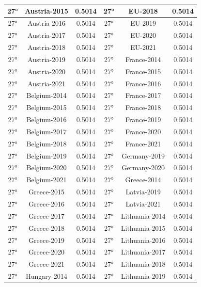 \documentclass[a4paper,12pt, openright]{report}
\begin{document}
\begin{longtable}[c]{|c|c|c|c|c|c|}
    \hline
    27° & Austria-2015 & 0.5014 & 27° & EU-2018 & 0.5014 \\
    \hline
    27° &  Austria-2016 & 0.5014 & 27°	& EU-2019 & 0.5014 \\
    \hline
    27° &  Austria-2017 & 0.5014 & 27° &  EU-2020 & 0.5014\\
    \hline
    27° & Austria-2018 & 0.5014 & 27° &  EU-2021  & 0.5014 \\
    \hline
    27° &  Austria-2019  & 0.5014& 27° &  France-2014 & 0.5014 \\
    \hline
    27° &  Austria-2020 & 0.5014 & 27° & France-2015 & 0.5014 \\
    \hline
    27° & Austria-2021 & 0.5014 & 27° &  France-2016 & 0.5014 \\
    \hline
    27° &  Belgium-2014 & 0.5014 & 27° & France-2017 & 0.5014 \\
    \hline
    27° &  Belgium-2015 & 0.5014 & 27° & France-2018  & 0.5014 \\
    \hline
    27° & Belgium-2016  & 0.5014 & 27° &  France-2019 & 0.5014 \\
    \hline
    27° &  Belgium-2017 & 0.5014  & 27° &  France-2020 & 0.5014 \\
    \hline
    27° & Belgium-2018 & 0.5014 & 27° & France-2021 & 0.5014 \\
    \hline
    27° &  Belgium-2019 & 0.5014  & 27° &  Germany-2019 & 0.5014 \\
    \hline
    27° &  Belgium-2020 & 0.5014 & 27° &  Germany-2020  & 0.5014 \\
    \hline
    27° &  Belgium-2021  & 0.5014 & 27° &  Greece-2014 & 0.5014 \\
    \hline
    27° &  Greece-2015 & 0.5014 & 27° & Latvia-2019 & 0.5014 \\
    \hline
    27° &  Greece-2016 & 0.5014 & 27° & Latvia-2021  & 0.5014 \\
    \hline
    27° &  Greece-2017 & 0.5014 & 27° & Lithuania-2014 & 0.5014 \\
    \hline
    27° &  Greece-2018  & 0.5014 & 27° & Lithuania-2015 & 0.5014 \\
    \hline
    27° &  Greece-2019 & 0.5014 & 27° & Lithuania-2016 & 0.5014 \\
    \hline
    27° &  Greece-2020 & 0.5014 & 27° & Lithuania-2017 & 0.5014 \\
    \hline
    27° &  Greece-2021 & 0.5014 & 27° & Lithuania-2018  & 0.5014 \\
    \hline
    27° &  Hungary-2014 & 0.5014  & 27° & Lithuania-2019 & 0.5014 \\

\end{longtable}
\end{document}
